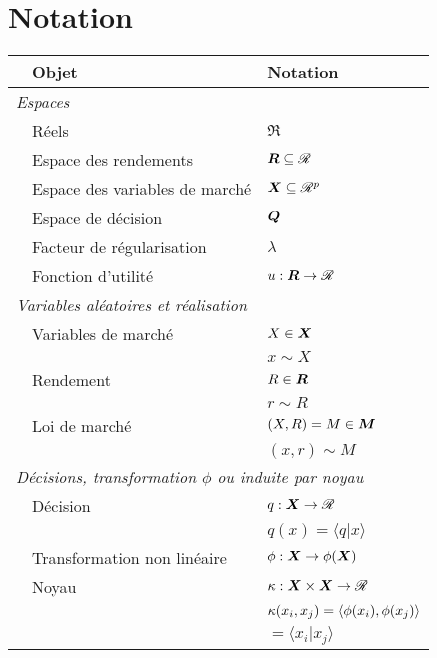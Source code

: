 \section*{Notation}

\begin{table}[h!]
  \begin{tabular}{@{}lll}
    &\textbf{Objet} & \textbf{Notation}\\
    \toprule
    \multicolumn{3}{l}{\textit{Espaces}\hspace{67ex}\,}\\[1ex]
    & Réels & $\Re$\\
    & Espace des rendements & $\bm{R} \subseteq \mathscr{R}$\\
    & Espace des variables de marché & $\bm{X} \subseteq \mathscr{R}^p$\\
    & Espace de décision & $\bm Q$\\
    & Facteur de régularisation & $\lambda$\\
    & Fonction d'utilité & $u:\bm{R}\to\mathscr{R}$\\

    \midrule
    \multicolumn{3}{l}{\textit{Variables aléatoires et réalisation}}\\[1ex]
    &Variables de marché & $X \in \bm{X}$\\
    &               & $x \sim X$\\[0.8ex]
    &Rendement & $R \in \bm{R}$\\
    &               &$r \sim R$\\[0.8ex]
    &Loi de marché & $(X,R) = M \in \bm M$\\
    &               & $(x,r) \sim M$\\
    
    \midrule
    \multicolumn{3}{l}{\textit{Décisions, transformation $\phi$ ou induite par noyau}}\\[1ex]
    & Décision & $q:\bm{X}\to\mathscr{R}$\\
    & & $q(x) = \langle q|x \rangle$\\[0.8ex]
    & Transformation non linéaire & $\phi:\bm{X} \to \phi(\bm{X})$\\[0.8ex]
    & Noyau & $\kappa:\bm{X}\times\bm{X} \to \mathscr{R}$\\
    &                & $\kappa(x_i,x_j) = \langle\phi(x_i),\phi(x_j)\rangle$\\
    &                & \hspace{\widthof{$\kappa(x_i,x_j)$}} $ = \langle x_i|x_j \rangle$\\[0.8ex]
    

\end{tabular}
\end{table}
